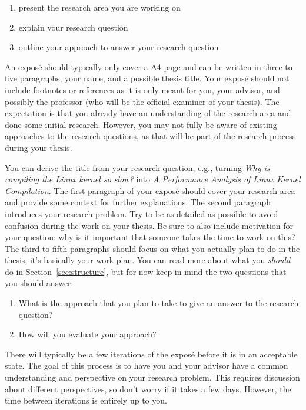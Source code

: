 \documentclass[a4]{article}
\begin{document}
\begin{enumerate}
    \item present the research area you are working on
    \item explain your research question
    \item outline your approach to answer your research question
\end{enumerate}

An expos\'e should typically only cover a A4 page and can be written in three to five paragraphs, your name, and a possible thesis title.
Your expos\'e should not include footnotes or references as it is only meant for you, your advisor, and possibly the professor (who will be the official examiner of your thesis).
The expectation is that you already have an understanding of the research area and done some initial research.
However, you may not fully be aware of existing approaches to the research questions, as that will be part of the research process during your thesis.

You can derive the title from your research question, e.g., turning \emph{Why is compiling the Linux kernel so slow?} into \emph{A Performance Analysis of Linux Kernel Compilation}.
The first paragraph of your expos\'e should cover your research area and provide some context for further explanations.
The second paragraph introduces your research problem.
Try to be as detailed as possible to avoid confusion during the work on your thesis.
Be sure to also include motivation for your question: why is it important that someone takes the time to work on this?
The third to fifth paragraphs should focus on what you actually plan to do in the thesis, it's basically your work plan.
You can read more about what you \emph{should} do in Section~\ref{sec:structure}, but for now keep in mind the two questions that you should answer:

\begin{enumerate}
    \item What is the approach that you plan to take to give an answer to the research question?
    \item How will you evaluate your approach?
\end{enumerate}

There will typically be a few iterations of the expos\'e before it is in an acceptable state.
The goal of this process is to have you and your advisor have a common understanding and perspective on your research problem.
This requires discussion about different perspectives, so don't worry if it takes a few days.
However, the time between iterations is entirely up to you.
\end{document}

